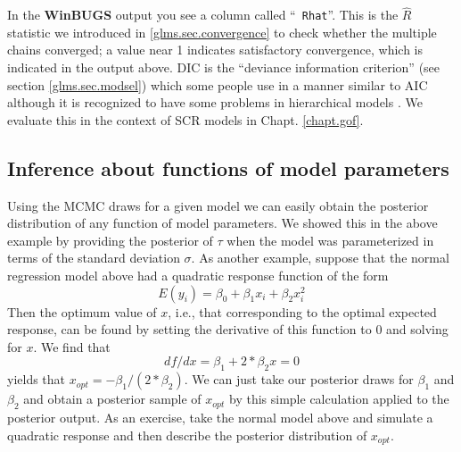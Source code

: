  In the {\bf WinBUGS} output you see a column called ``\mbox{\tt
   Rhat}''. This is the $\hat{R}$ statistic we introduced in
 \ref{glms.sec.convergence} to check whether the multiple chains
 converged; a value near 1 indicates satisfactory convergence, which
 is indicated in the output above. DIC is the
``deviance information criterion'' \citep{spiegelhalter_etal:2002}
(see section \ref{glms.sec.modsel})
 which
some people use in a manner similar to AIC although it is recognized
to have some problems in hierarchical models \citep{millar:2009}. We
evaluate this in the context of SCR models in Chapt. \ref{chapt.gof}.




\subsection{Inference about functions of model parameters}
\label{glms.sec.xopt}

Using the MCMC draws for a given model we can easily obtain the
posterior distribution of any function of model parameters.  We showed
this in the above example by providing the posterior of $\tau$ when
the model was parameterized in terms of the standard deviation $\sigma$.
 As another example, suppose that the
normal regression model above had a quadratic response function of the
form
\[
	E(y_i) = \beta_0 + \beta_1 x_i + \beta_2 x_{i}^{2}
\]
Then the optimum value of $x$, i.e., that corresponding to the optimal
expected response, can be found by setting the derivative of
this function to 0 and solving for $x$. We find that
\[
df/dx = \beta_1 +
2*\beta_2 x = 0
\]
yields that $x_{opt} = -\beta_1/(2*\beta_2)$.  We can just
take our posterior draws for $\beta_1$ and $\beta_2$ and obtain a
posterior sample of $x_{opt}$ by this simple calculation applied to
the posterior output. As an exercise, take
the normal model above and simulate a quadratic response and then
describe the posterior distribution of $x_{opt}$.


